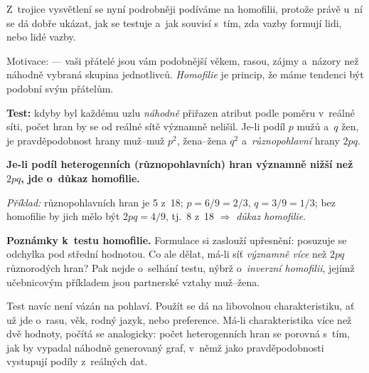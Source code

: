 \documentclass[11pt,a4paper]{article}
\theoremstyle{definition}
\begin{document}
Z~trojice vysvětlení se nyní podrobněji podíváme na homofilii, protože právě u~ní se dá dobře
ukázat, jak se testuje a~jak souvisí s~tím, zda vazby formují lidi, nebo lidé vazby.

\begin{defbox}
Motivace:  --- vaši přátelé jsou vám podobnější věkem, rasou, zájmy
a~názory než náhodně vybraná skupina jednotlivců. \emph{Homofilie} je princip, že máme tendenci
být podobní svým přátelům.

\textbf{Test:} kdyby byl každému uzlu \emph{náhodně} přiřazen atribut podle poměru v~reálné
síti, počet  hran by se od reálné sítě významně nelišil. Je-li podíl $p$ mužů
a~$q$ žen, je pravděpodobnost hrany muž--muž $p^2$, žena--žena $q^2$ a~\emph{různopohlavní}
hrany $2pq$.

\textbf{Je-li podíl heterogenních (různopohlavních) hran významně nižší než $2pq$, jde
o~důkaz homofilie.}

\emph{Příklad:} různopohlavních hran je 5 z~18; $p=6/9=2/3$, $q=3/9=1/3$; bez homofilie by
jich mělo být $2pq=4/9$, tj.\ 8 z~18 $\Rightarrow$ \emph{důkaz homofilie}.
\end{defbox}

\textbf{Poznámky k~testu homofilie.} Formulace  si zaslouží upřesnění:
posuzuje se odchylka pod střední hodnotou. Co ale dělat, má-li síť \emph{významně více} než
$2pq$ různorodých hran? Pak nejde o~selhání testu, nýbrž o~\emph{inverzní homofilii}, jejímž
učebnicovým příkladem jsou partnerské vztahy muž--žena.

Test navíc není vázán na pohlaví. Použít se dá na libovolnou charakteristiku, ať už jde o~rasu,
věk, rodný jazyk, nebo preference. Má-li charakteristika více než dvě hodnoty, počítá se
analogicky: počet heterogenních hran se porovná s~tím, jak by vypadal náhodně generovaný graf,
v~němž jako pravděpodobnosti vystupují podíly z~reálných dat.
\end{document}
